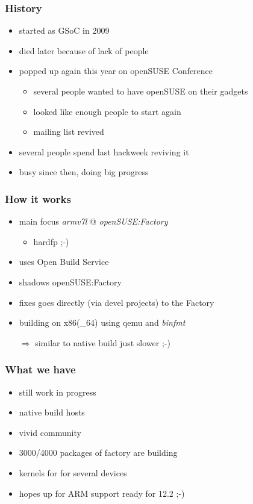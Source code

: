 \documentclass{beamer}
\begin{document}

\begin{frame}[t]
\frametitle{History}
\begin{itemize}
   \item started as GSoC in 2009
   \item died later because of lack of people
   \item popped up again this year on openSUSE Conference
   \begin{itemize}
   	\item several people wanted to have openSUSE on their gadgets
	\item looked like enough people to start again
	\item mailing list revived
   \end{itemize}
   \item several people spend last hackweek reviving it
   \item busy since then, doing big progress
\end{itemize}
\end{frame}

\begin{frame}[t]
\frametitle{How it works}
\begin{itemize}
   \item main focus \textit{armv7l} @ \textit{openSUSE:Factory}
   \begin{itemize}
   	\item hardfp ;-)
   \end{itemize}
   \item uses Open Build Service
   \item shadows openSUSE:Factory
   \item fixes goes directly (via devel projects) to the Factory
   \item building on x86(\_64) using qemu and \textit{binfmt}
   \item[\(\Rightarrow\)] similar to native build just slower ;-)
\end{itemize}
\end{frame}

\begin{frame}[t]
\frametitle{What we have}
\begin{itemize}
   \item still work in progress
   \item native build hosts
   \item vivid community
   \item 3000/4000 packages of factory are building
   \item kernels for for several devices
   \item hopes up for ARM support ready for 12.2 ;-)
\end{itemize}
\end{frame}
\end{document}
